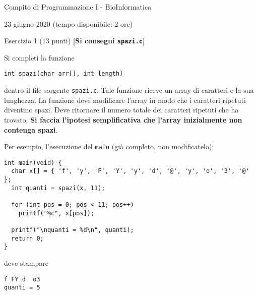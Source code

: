\documentclass[12pt]{article}
\begin{document}
\begin{center}{\LARGE Compito di Programmazione I - BioInformatica}\\
\vspace*{-2ex}
\begin{center}
  \large 23 giugno 2020 (tempo disponibile: 2 ore)
\end{center}
\end{center}

\vspace*{1ex}
\begin{center}{\Large Esercizio 1} ($13$ punti) \textbf{[Si consegni \texttt{spazi.c}]}\end{center}

Si completi la funzione
%
\begin{verbatim}
int spazi(char arr[], int length)
\end{verbatim}
%
dentro il file sorgente \texttt{spazi.c}. Tale funzione riceve un array di caratteri
e la sua lunghezza. La funzione deve modificare l'array in modo che i caratteri ripetuti
diventino spazi. Deve ritornare il numero totale dei caratteri ripetuti che ha trovato.
\textbf{Si faccia l'ipotesi semplificativa che l'array inizialmente non contenga spazi}.

Per esempio, l'esecuzione del \texttt{main} (gi\`a completo, non modificatelo):

\begin{verbatim}
int main(void) {
  char x[] = { 'f', 'y', 'F', 'Y', 'y', 'd', '@', 'y', 'o', '3', '@' };
  int quanti = spazi(x, 11);

  for (int pos = 0; pos < 11; pos++)
    printf("%c", x[pos]);

  printf("\nquanti = %d\n", quanti);
  return 0;
}
\end{verbatim}
%
deve stampare
%
\begin{verbatim}
f FY d  o3 
quanti = 5
\end{verbatim}
\end{document}

